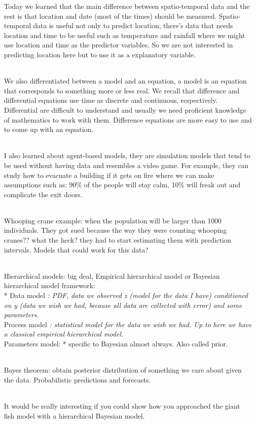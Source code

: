 \documentclass[
]{book}
\begin{document}
Today we learned that the main difference between spatio-temporal data and the rest is that location and date (most of the times) should be measured. Spatio-temporal data is useful not only to predict location, there's data that needs location and time to be useful such as temperature and rainfall where we might use location and time as the predictor variables. So we are not interested in predicting location here but to use it as a explanatory variable.\\
\strut \\
We also differentiated between a model and an equation, a model is an equation that corresponds to something more or less real.
We recall that difference and differential equations use time as discrete and continuous, respectively.
Differential are difficult to understand and usually we need proficient knowledge of mathematics to work with them. Difference equations are more easy to use and to come up with an equation.\\
\strut \\
I also learned about agent-based models, they are simulation models that tend to be used without having data and resembles a video game. For example, they can study how to evacuate a building if it gets on fire where we can make assumptions such as: 90\% of the people will stay calm, 10\% will freak out and complicate the exit doors.\\
\strut \\
Whooping crane example: when the population will be larger than 1000 individuals. They got sued because the way they were counting whooping cranes?? what the heck? they had to start estimating them with prediction intervals. Models that could work for this data?\\
\strut \\
Hierarchical models: big deal, Empirical hierarchical model or Bayesian hierarchical model framework:\\
* Data model \emph{: PDF, data we observed z (model for the data I have) conditioned on y (data we wish we had, because all data are collected with error) and some parameters.\\
} Process model \emph{: statistical model for the data we wish we had. Up to here we have a classical empirical hierarchical model.\\
} Parameters model: * specific to Bayesian almost always. Also called prior.\\
\strut \\
Bayes theorem: obtain posterior distribution of something we care about given the data. Probabilistic predictions and forecasts.\\
\strut \\
It would be really interesting if you could show how you approached the giant fish model with a hierarchical Bayesian model.
\end{document}
